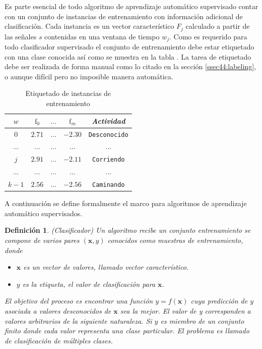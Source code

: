 Es parte esencial de todo algoritmo de aprendizaje automático supervisado
contar con un conjunto de instancias de entrenamiento con información
adicional de clasificación. Cada instancia es un vector característico
$F_{j}$ calculado a partir de las señales $s$ contenidas en una
ventana de tiempo $w_{j}$. Como es requerido para todo clasificador
supervisado el conjunto de entrenamiento debe estar etiquetado con
una clase conocida así como se muestra en la tabla .
La tarea de etiquetado debe ser realizada de forma manual como lo
citado en la sección \ref{ssec44:labeling}, o aunque difícil pero
no imposible manera automática.

\begin{table}[!tbph]
\begin{centering}
\begin{tabular}{|c|c|c|c|c|}
\hline 
$w$ & $\mathrm{f}_{0}$ & $\ldots$ & $\mathrm{f}_{m}$ & \emph{Actividad}\tabularnewline
\hline 
\hline 
$0$ & $2.71$ & \texttt{$\ldots$} & \texttt{$-2.30$} & \texttt{\small{}Desconocido}\tabularnewline
\hline 
$\ldots$ & $\ldots$ & \texttt{$\ldots$} & \texttt{$\ldots$} & \texttt{$\ldots$}\tabularnewline
\hline 
$j$ & $2.91$ & \texttt{$\ldots$} & \texttt{$-2.11$} & \texttt{\small{}Corriendo}\tabularnewline
\hline 
$\ldots$ & $\ldots$ & \texttt{$\ldots$} & \texttt{$\ldots$} & \texttt{$\ldots$}\tabularnewline
\hline 
$k-1$ & $2.56$ & \texttt{$\ldots$} & \texttt{$-2.56$} & \texttt{\small{}Caminando}\tabularnewline
\hline 
\end{tabular}
\par\end{centering}
\caption[Etiquetado de instancias]{\label{tab4:labeled}Etiquetado de instancias de entrenamiento}
\end{table}

A continuación se define formalmente el marco para algoritmos de aprendizaje
automático supervisados\cite{Rajaraman2011}.

\label{def4:clasificacion}\newtheorem{defs}{Definición}

\begin{defs}(Clasificador) Un algoritmo recibe
un conjunto entrenamiento se compone de varios pares $(\boldsymbol{x},y)$
conocidos como muestras de entrenamiento, donde
\begin{itemize}
\item $\boldsymbol{x}$ es un\emph{ vector} de valores, llamado vector característico.
\item $y$ es la\emph{ etiqueta}, el valor de clasificación para $\boldsymbol{x}$.
\end{itemize}
El objetivo del proceso es encontrar una función $y=f(\boldsymbol{x})$
cuya predicción de $y$ asociada a valores desconocidos de $\boldsymbol{x}$
sea la mejor. El valor de y corresponden a valores arbitrarios de
la siguiente naturaleza. Si $y$ es miembro de un conjunto finito
donde cada valor representa una clase particular. El problema es llamado
de clasificación de múltiples clases.\end{defs}

